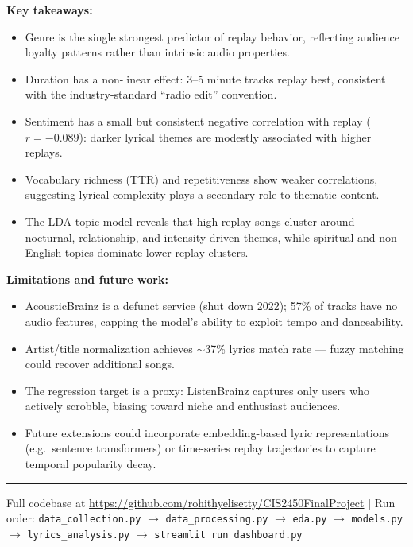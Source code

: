 \documentclass[11pt, letterpaper]{article}
\begin{document}
\textbf{Key takeaways:}
\begin{itemize}[noitemsep]
    \item Genre is the single strongest predictor of replay behavior, reflecting audience
          loyalty patterns rather than intrinsic audio properties.
    \item Duration has a non-linear effect: 3–5 minute tracks replay best, consistent
          with the industry-standard ``radio edit'' convention.
    \item Sentiment has a small but consistent negative correlation with replay
          ($r = -0.089$): darker lyrical themes are modestly associated with higher replays.
    \item Vocabulary richness (TTR) and repetitiveness show weaker correlations,
          suggesting lyrical complexity plays a secondary role to thematic content.
    \item The LDA topic model reveals that high-replay songs cluster around nocturnal,
          relationship, and intensity-driven themes, while spiritual and non-English
          topics dominate lower-replay clusters.
\end{itemize}

\textbf{Limitations and future work:}
\begin{itemize}[noitemsep]
    \item AcousticBrainz is a defunct service (shut down 2022); 57\% of tracks have
          no audio features, capping the model's ability to exploit tempo and danceability.
    \item Artist/title normalization achieves $\sim$37\% lyrics match rate — fuzzy
          matching could recover additional songs.
    \item The regression target is a proxy: ListenBrainz captures only users who
          actively scrobble, biasing toward niche and enthusiast audiences.
    \item Future extensions could incorporate embedding-based lyric representations
          (e.g.\ sentence transformers) or time-series replay trajectories to capture
          temporal popularity decay.
\end{itemize}

\vspace{1em}
\color{accent}\rule{\linewidth}{0.6pt}\color{black}
\begin{center}
\small\color{mutedgray}
Full codebase at \url{https://github.com/rohithyelisetty/CIS2450FinalProject}
\quad|\quad
Run order: \texttt{data\_collection.py} $\to$ \texttt{data\_processing.py} $\to$
\texttt{eda.py} $\to$ \texttt{models.py} $\to$ \texttt{lyrics\_analysis.py} $\to$
\texttt{streamlit run dashboard.py}
\end{center}
\end{document}
